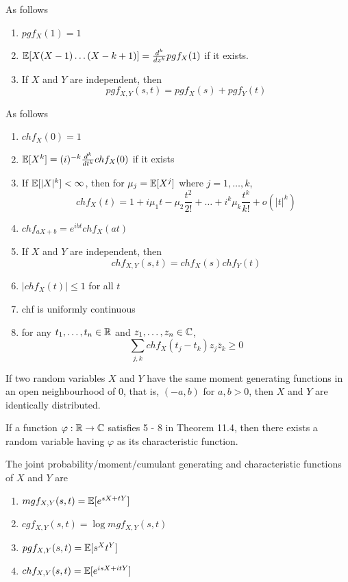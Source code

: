 \documentclass[11pt]{article}
\begin{document}
As follows
\begin{enumerate}
	\item $pgf_X(1) = 1$
	\item $\mathbb{E}[{X(X-1)\hdots(X-k+1)}] = \frac{d^k}{dz^k}pgf_X(1)$ if it exists.
	\item  If $X$ and $Y$ are independent, then $$pgf_{X,Y}(s,t) = pgf_X(s) + pgf_Y(t)$$
\end{enumerate}
	
As follows
\begin{enumerate}
	\item $chf_X(0) = 1$
	\item $\mathbb{E}[{X^k}] = (i)^{-k}\frac{d^k}{dt^k} chf_X(0)$ if it exists
	\item If $\mathbb{E}[{|X|^k}] < \infty$, then for $\mu_j = \mathbb{E}[{X^j}]$ where $j = 1, \hdots, k$, 
	$$chf_X(t) = 1 + i\mu_1t - \mu_2\frac{t^2}{2!} + \hdots + i^k \mu_k\frac{t^k}{k!} + o(|t|^k)$$
	\item $chf_{aX+b} = e^{ibt}chf_X(at)$
	\item If $X$ and $Y$ are independent, then $$chf_{X,Y}(s,t) = chf_X(s)chf_Y(t)$$
	\item $|chf_X(t)| \leq 1$ for all $t$
	\item chf is uniformly continuous
	\item for any $t_1, \hdots, t_n \in \mathbb{R}$ and $z_1, \hdots, z_n \in \mathbb{C}$, $$\sum_{j,k}chf_X(t_j - t_k)z_j\bar{z}_k \geq 0$$
\end{enumerate}

\theorem If two random variables $X$ and $Y$ have the same moment generating functions in an open neighbourhood of 0, that is, $(-a, b)$ for $a,b > 0$, then $X$ and $Y$ are identically distributed.

\theorem
If a function $\varphi: \mathbb{R} \rightarrow \mathbb{C}$ satisfies 5 - 8 in Theorem 11.4, then there exists a random variable having $\varphi$ as its characteristic function.

The joint probability/moment/cumulant generating and characteristic functions of $X$ and $Y$ are
\begin{enumerate}
	\item $mgf_{X, Y}(s,t) = \mathbb{E}[{e^{sX + tY}}]$
	\item $cgf_{X, Y}(s,t) = \log mgf_{X,Y}(s,t)$
	\item $pgf_{X, Y}(s,t) = \mathbb{E}[{s^Xt^Y}]$
	\item $chf_{X, Y}(s,t) = \mathbb{E}[{e^{isX + itY}}]$
\end{enumerate}
\end{document}
